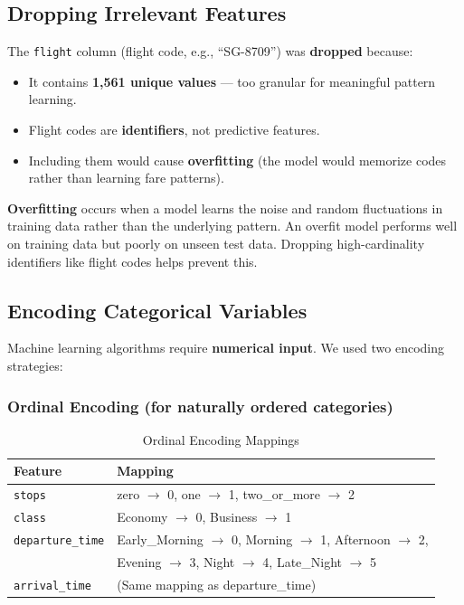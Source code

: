 \documentclass[12pt, a4paper]{article}
\begin{document}
\subsection{Dropping Irrelevant Features}

The \texttt{flight} column (flight code, e.g., ``SG-8709'') was \textbf{dropped} because:
\begin{itemize}[leftmargin=*]
    \item It contains \textbf{1,561 unique values} — too granular for meaningful pattern learning.
    \item Flight codes are \textbf{identifiers}, not predictive features.
    \item Including them would cause \textbf{overfitting} (the model would memorize codes rather than learning fare patterns).
\end{itemize}

\begin{keyterm}
\textbf{Overfitting} occurs when a model learns the noise and random fluctuations in training data rather than the underlying pattern. An overfit model performs well on training data but poorly on unseen test data. Dropping high-cardinality identifiers like flight codes helps prevent this.
\end{keyterm}

\subsection{Encoding Categorical Variables}

Machine learning algorithms require \textbf{numerical input}. We used two encoding strategies:

\subsubsection{Ordinal Encoding (for naturally ordered categories)}

\begin{table}[H]
\centering
\caption{Ordinal Encoding Mappings}
\begin{tabular}{ll}
\toprule
\textbf{Feature} & \textbf{Mapping} \\
\midrule
\texttt{stops} & zero $\rightarrow$ 0, one $\rightarrow$ 1, two\_or\_more $\rightarrow$ 2 \\
\texttt{class} & Economy $\rightarrow$ 0, Business $\rightarrow$ 1 \\
\texttt{departure\_time} & Early\_Morning $\rightarrow$ 0, Morning $\rightarrow$ 1, Afternoon $\rightarrow$ 2, \\
                         & Evening $\rightarrow$ 3, Night $\rightarrow$ 4, Late\_Night $\rightarrow$ 5 \\
\texttt{arrival\_time} & (Same mapping as departure\_time) \\
\bottomrule
\end{tabular}
\end{table}
\end{document}
